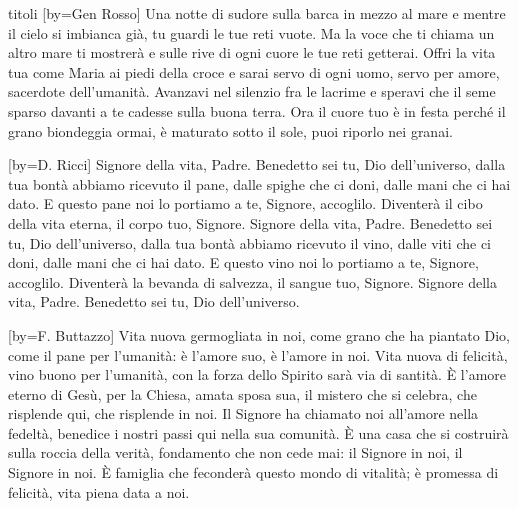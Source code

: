 \begin{songs}{titoli}
[by={Gen Rosso}]
\beginverse
Una notte di sudore sulla barca in mezzo al mare
e mentre il cielo si imbianca già, tu guardi le tue reti vuote.
Ma la voce che ti chiama un altro mare ti mostrerà
e sulle rive di ogni cuore le tue reti getterai.
\endverse
\beginchorus
Offri la vita tua
come Maria ai piedi della croce
e sarai servo di ogni uomo, servo per amore, sacerdote dell'umanità.
\endchorus
\beginverse
Avanzavi nel silenzio fra le lacrime e speravi
che il seme sparso davanti a te cadesse sulla buona terra.
Ora il cuore tuo è in festa perché il grano biondeggia ormai,
è maturato sotto il sole, puoi riporlo nei granai.
\endverse
\endsong

[by={D. Ricci}]
\beginverse
Signore della vita, Padre. Benedetto sei tu, Dio dell'universo,
dalla tua bontà abbiamo ricevuto il pane,
dalle spighe che ci doni, dalle mani che ci hai dato.
E questo pane noi lo portiamo a te, Signore, accoglilo.
Diventerà il cibo della vita eterna, il corpo tuo, Signore.
\endverse
\beginverse
Signore della vita, Padre. Benedetto sei tu, Dio dell'universo,
dalla tua bontà abbiamo ricevuto il vino,
dalle viti che ci doni, dalle mani che ci hai dato.
E questo vino noi lo portiamo a te, Signore, accoglilo.
Diventerà la bevanda di salvezza, il sangue tuo, Signore.
\endverse
\beginverse*
Signore della vita, Padre. Benedetto sei tu, Dio dell'universo.
\endverse
\endsong

[by={F. Buttazzo}]
\beginverse
Vita nuova germogliata in noi, come grano che ha piantato Dio,
come il pane per l'umanità: è l'amore suo, è l'amore in noi.
Vita nuova di felicità, vino buono per l'umanità,
con la forza dello Spirito sarà via di santità. 
\endverse
\beginverse
È l'amore eterno di Gesù, per la Chiesa, amata sposa sua,
il mistero che si celebra, che risplende qui, che risplende in noi.
Il Signore ha chiamato noi all'amore nella fedeltà,
benedice i nostri passi qui nella sua comunità. 
\endverse
\beginverse
È una casa che si costruirà sulla roccia della verità,
fondamento che non cede mai: il Signore in noi, il Signore in noi.
È famiglia che feconderà questo mondo di vitalità;
è promessa di felicità, vita piena data a noi. 
\endverse
\endsong


\end{songs}
